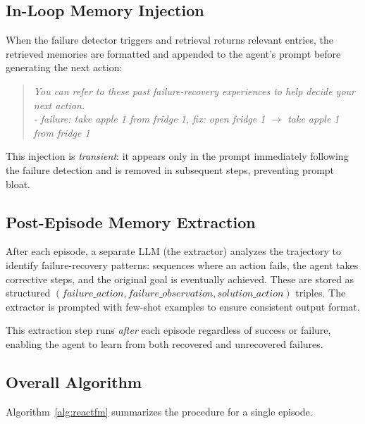 \subsection{In-Loop Memory Injection}
\label{sec:injection}

When the failure detector triggers and retrieval returns relevant entries, the retrieved memories are formatted and appended to the agent's prompt before generating the next action:

\begin{quote}
\small\textit{You can refer to these past failure-recovery experiences to help decide your next action.}\\
\textit{- failure: take apple 1 from fridge 1, fix: open fridge 1 $\to$ take apple 1 from fridge 1}
\end{quote}

This injection is \emph{transient}: it appears only in the prompt immediately following the failure detection and is removed in subsequent steps, preventing prompt bloat.

\subsection{Post-Episode Memory Extraction}
\label{sec:extraction}

After each episode, a separate LLM (the extractor) analyzes the trajectory to identify failure-recovery patterns: sequences where an action fails, the agent takes corrective steps, and the original goal is eventually achieved. These are stored as structured $(failure\_action, failure\_observation, solution\_action)$ triples. The extractor is prompted with few-shot examples to ensure consistent output format.

This extraction step runs \emph{after} each episode regardless of success or failure, enabling the agent to learn from both recovered and unrecovered failures.

\subsection{Overall Algorithm}

Algorithm~\ref{alg:reactfm} summarizes the \method{} procedure for a single episode.

